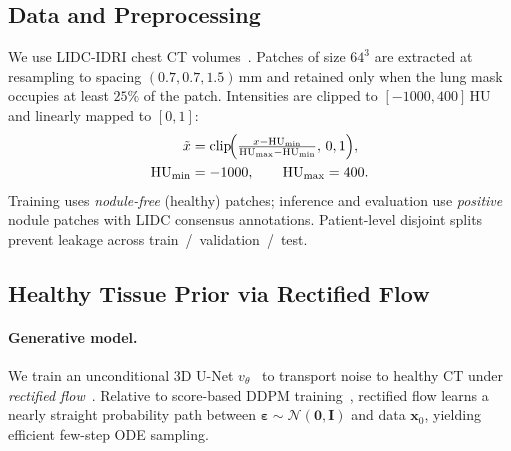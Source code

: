 \documentclass[letterpaper]{article} %
\begin{document}
\subsection{Data and Preprocessing}
\label{sec:method:data}

We use LIDC-IDRI chest CT volumes~\cite{lidc2011}.
Patches of size \(64^{3}\) are extracted at resampling to spacing
\((0.7,0.7,1.5)\,\mathrm{mm}\) and retained only when the lung mask occupies at
least \(25\%\) of the patch.
Intensities are clipped to \([-1000,400]\,\mathrm{HU}\) and linearly mapped to
\([0,1]\):
\begin{equation}
\begin{aligned}
\tilde{x}
&=
\mathrm{clip}\!\Bigl(
\tfrac{x - \mathrm{HU}_{\min}}{\mathrm{HU}_{\max}-\mathrm{HU}_{\min}},\,0,1
\Bigr),\\
\mathrm{HU}_{\min}&=-1000,\qquad
\mathrm{HU}_{\max}=400.
\end{aligned}
\end{equation}
Training uses \emph{nodule-free} (healthy) patches; inference and evaluation use
\emph{positive} nodule patches with LIDC consensus annotations.
Patient-level disjoint splits prevent leakage across train~/~validation~/~test.

\subsection{Healthy Tissue Prior via Rectified Flow}
\label{sec:method:rflow}

\paragraph{Generative model.}
We train an unconditional 3D U-Net \(v_\theta\)~\cite{ronneberger2015unet}
to transport noise to healthy CT under
\emph{rectified flow}~\cite{liu2023flow,lipman2023flowmatching}.
Relative to score-based DDPM training~\cite{ho2020ddpm}, rectified flow learns a nearly straight
probability path between \(\boldsymbol{\varepsilon}\sim\mathcal{N}(\mathbf{0},\mathbf{I})\)
and data \(\mathbf{x}_0\), yielding efficient few-step ODE sampling.
\end{document}
